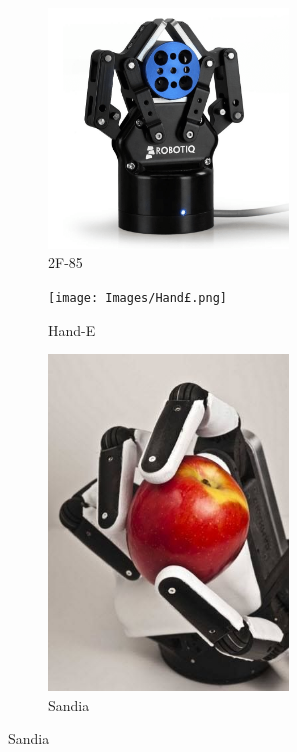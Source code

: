 \begin{figure}
\begin{subfigure}{.3\linewidth}
        \includegraphics[width=0.7\textwidth]{Images/Robotiq-2-Finger-85-encompassing-grip.png}
        \caption{2F-85}
        \label{label:Robotiq85}
    \end{subfigure}
    \begin{subfigure}{.3\linewidth}
        \centering
        \texttt{[image: Images/Hand£.png]}           \caption{Hand-E}
        \label{label:Hand-E}
    \end{subfigure}
    \begin{subfigure}{.3\linewidth}
        \centering
        \includegraphics[width=0.7\textwidth]{Images/Sandia.jpg}        \caption{Sandia}

\end{subfigure}
\end{figure}
